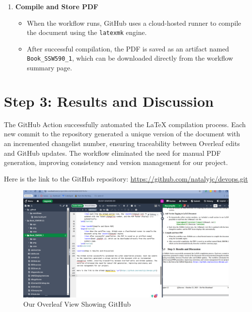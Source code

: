 \begin{enumerate}
    \item \textbf{Compile and Store PDF}
    \begin{itemize}
        \item When the workflow runs, GitHub uses a cloud-hosted runner to compile the document using the \texttt{latexmk} engine.
        \item After successful compilation, the PDF is saved as an artifact named \texttt{Book\_SSW590\_1}, which can be downloaded directly from the workflow summary page.
    \end{itemize}
\end{enumerate}

\section{Step 3: Results and Discussion}

The GitHub Action successfully automated the LaTeX compilation process. Each new commit to the repository generated a unique version of the document with an incremented changelist number, ensuring traceability between Overleaf edits and GitHub updates. The workflow eliminated the need for manual PDF generation, improving consistency and version management for our project. 

Here is the link to the GitHub repository: \url{https://github.com/natalyjc/devops.git}

\begin{figure}[ht]
    \centering
    \includegraphics[width=0.6\linewidth]{Book_SSW590_1/png/GitHubActionSS.png}
    \caption{Our Overleaf View Showing GitHub}
    \label{Our Overleaf View Showing GitHub}
\end{figure}


